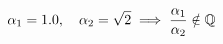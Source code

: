 \documentclass[preview]{standalone}
\begin{document}
\begin{align*}
\special{dvisvgm:raw <g id='unique000'>}\alpha_1 = 1.0, \quad \alpha_2 = \sqrt{2} \implies \frac{\alpha_1}{\alpha_2} \notin \mathbb{Q}\special{dvisvgm:raw </g>}
\end{align*}
\end{document}
